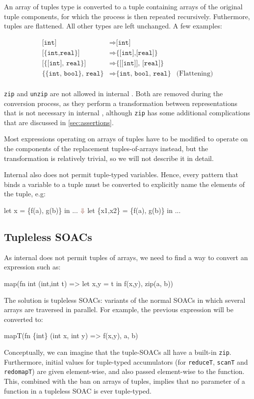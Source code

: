 An array of tuples type is converted to a tuple containing arrays of
the original tuple components, for which the process is then repeated
recursively.  Futhermore, tuples are flattened.  All other types are
left unchanged.  A few examples:

\begin{align*}
\texttt{[int]} &\Rightarrow \texttt{[int]} \\
\texttt{[\{int,real\}]} &\Rightarrow \texttt{\{[int],[real]\}} \\
\texttt{[\{[int], real\}]} &\Rightarrow \texttt{\{[[int]], [real]\}} \\
\texttt{\{\{int, bool\}, real\}} &\Rightarrow \texttt{\{int, bool, real\}} & \text{(Flattening)} \\
\end{align*}

\texttt{zip} and \texttt{unzip} are not allowed in internal \LO{}.
Both are removed during the conversion process, as they perform a
transformation between representations that is not necessary in
internal \LO{}, although \texttt{zip} has some additional
complications that are discussed in \cref{sec:assertions}.

Most expressions operating on arrays of tuples have to be modified to
operate on the components of the replacement tuples-of-arrays instead,
but the transformation is relatively trivial, so we will not describe
it in detail.

Internal \LO{} also does not permit tuple-typed variables.  Hence,
every pattern that binds a variable to a tuple must be converted to
explicitly name the elements of the tuple, e.g:

\begin{colorcode}
let x = \{f(a), g(b)\} in
...
  \(\emp{\Downarrow}\)
let \{x1,x2\} = \{f(a), g(b)\} in
...
\end{colorcode}

\subsection{Tupleless SOACs}

As internal \LO{} does not permit tuples of arrays, we need to find a
way to convert an expression such as:
\begin{colorcode}
map(fn int ({int,int} t) =>
      let {x,y} = t in
      f(x,y),
    zip(a, b))
\end{colorcode}
The solution is tupleless SOACs: variants of the normal SOACs in which
several arrays are traversed in parallel.  For example, the previous
expression will be converted to:
\begin{colorcode}
mapT(fn \{int\} (int x, int y) =>
       f(x,y),
     a, b)
\end{colorcode}
Conceptually, we can imagine that the tuple-SOACs all have a built-in
\texttt{zip}.  Furthermore, initial values for tuple-typed
accumulators (for \texttt{reduceT}, \texttt{scanT} and
\texttt{redomapT}) are given element-wise, and also passed
element-wise to the function.  This, combined with the ban on arrays
of tuples, implies that no parameter of a function in a tupleless SOAC
is ever tuple-typed.

